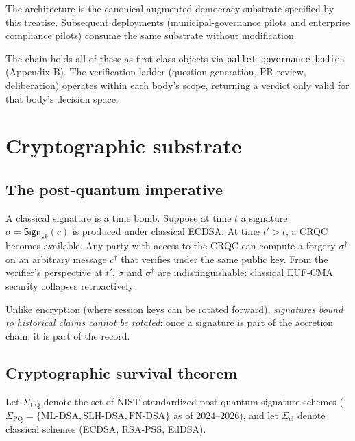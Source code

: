 \documentclass[11pt,a4paper,parskip=half-,DIV=12,headings=standardclasses]{scrartcl}
\theoremstyle{ncthm}
\theoremstyle{ncdef}
\newcommand{\pqset}{\Sigma_{\mathrm{PQ}}}
\newcommand{\Sign}{\mathsf{Sign}}
\begin{document}
The architecture is the canonical augmented-democracy substrate
specified by this treatise. Subsequent deployments (municipal-governance
pilots and enterprise compliance pilots) consume the same substrate
without modification.

The chain holds all of these as first-class objects via
\texttt{pallet-governance-bodies} (Appendix B). The verification
ladder (question generation, PR review, deliberation) operates
within each body's scope, returning a verdict only valid for that
body's decision space.

\section{Cryptographic substrate}\label{sec:crypto-substrate}

\subsection{The post-quantum imperative}

A classical signature is a time bomb. Suppose at time $t$ a signature
$\sigma = \Sign_{sk}(c)$ is produced under classical ECDSA. At time
$t' > t$, a CRQC becomes available. Any party with access to the
CRQC can compute a forgery $\sigma^\dagger$ on an arbitrary message
$c^\dagger$ that verifies under the same public key. From the
verifier's perspective at $t'$, $\sigma$ and $\sigma^\dagger$ are
indistinguishable: classical EUF-CMA security collapses retroactively.

Unlike encryption (where session keys can be rotated forward),
\emph{signatures bound to historical claims cannot be rotated}: once a
signature is part of the accretion chain, it is part of the record.

\subsection{Cryptographic survival theorem}

Let $\pqset$ denote the set of NIST-standardized post-quantum
signature schemes
($\pqset = \{\text{ML-DSA}, \text{SLH-DSA}, \text{FN-DSA}\}$ as of
2024--2026), and let $\Sigma_{\mathrm{cl}}$ denote classical schemes
(ECDSA, RSA-PSS, EdDSA).
\end{document}
